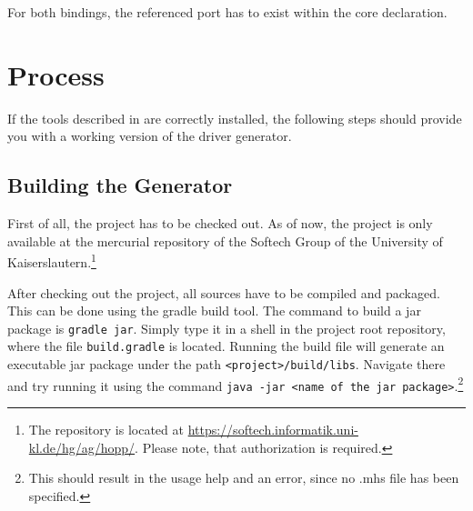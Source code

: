 \documentclass{report}
\begin{document}
For both bindings, the referenced port has to exist within the core declaration. 

\section{Process}
\label{sec:process}
If the tools described in  are correctly installed, the following steps should provide you with a working version of the driver generator.


%
%
%
%
%
%
%

\subsection{Building the Generator}
First of all, the project has to be checked out. As of now, the project is only available at the mercurial repository of the Softech Group of the University of Kaiserslautern.\footnote{The repository is located at \url{https://softech.informatik.uni-kl.de/hg/ag/hopp/}. Please note, that authorization is required.}

After checking out the project, all sources have to be compiled and packaged. This can be done using the gradle build tool. The command to build a jar package is \texttt{gradle jar}. Simply type it in a shell in the project root repository, where the file \texttt{build.gradle} is located. Running the build file will generate an executable jar package under the path \texttt{<project>/build/libs}. Navigate there and try running it using the command \texttt{java -jar <name of the jar package>}.\footnote{This should result in the usage help and an error, since no .mhs file has been specified.} 
\end{document}
